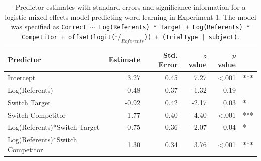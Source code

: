 \documentclass[man,floatsintext]{apa6}
\begin{document}
\begin{table}[t]
\begin{center}
\begin{tabular}{lrrrrl}
 Predictor & Estimate & Std. Error & $z$ value & $p$ value &  \\ 
  \hline
  Intercept & 3.27 & 0.45 & 7.27 & <.001 & *** \\ 
  Log(Referents) & -0.48 & 0.37 & -1.32 & 0.19 &  \\ 
  Switch Target & -0.92 & 0.42 & -2.17 & 0.03 & * \\ 
  Switch Competitor & -1.77 & 0.40 & -4.40 & <.001 & *** \\ 
  Log(Referents)*Switch Target & -0.75 & 0.36 & -2.07 & 0.04 & * \\ 
  Log(Referents)*Switch Competitor & 1.30 & 0.34 & 3.76 & <.001 & *** \\ 
   \hline
\end{tabular}
\label{tab:exp3_reg}\end{center}
\vspace{6pt}
\caption{\label{tab:exp3_reg}Predictor estimates with standard errors and significance information for a logistic mixed-effects model predicting word learning in Experiment 1. The model was specified as \small{\tt{Correct $\sim$ Log(Referents) * Target + Log(Referents) * Competitor + offset(logit($^1/_{Referents}$)) + (TrialType | subject)}}.}
\end{table}



\end{document}
